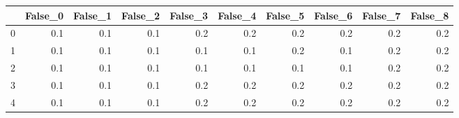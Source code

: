 \begin{tabular}{lrrrrrrrrr}
\toprule
{} &  False\_0 &  False\_1 &  False\_2 &  False\_3 &  False\_4 &  False\_5 &  False\_6 &  False\_7 &  False\_8 \\ \hline
\midrule
0 &      0.1 &      0.1 &      0.1 &      0.2 &      0.2 &      0.2 &      0.2 &      0.2 &      0.2 \\ \hline
1 &      0.1 &      0.1 &      0.1 &      0.1 &      0.1 &      0.2 &      0.1 &      0.2 &      0.2 \\ \hline
2 &      0.1 &      0.1 &      0.1 &      0.1 &      0.1 &      0.1 &      0.1 &      0.2 &      0.2 \\ \hline
3 &      0.1 &      0.1 &      0.1 &      0.2 &      0.2 &      0.2 &      0.2 &      0.2 &      0.2 \\ \hline
4 &      0.1 &      0.1 &      0.1 &      0.2 &      0.2 &      0.2 &      0.2 &      0.2 &      0.2 \\ \hline
\bottomrule
\end{tabular}
